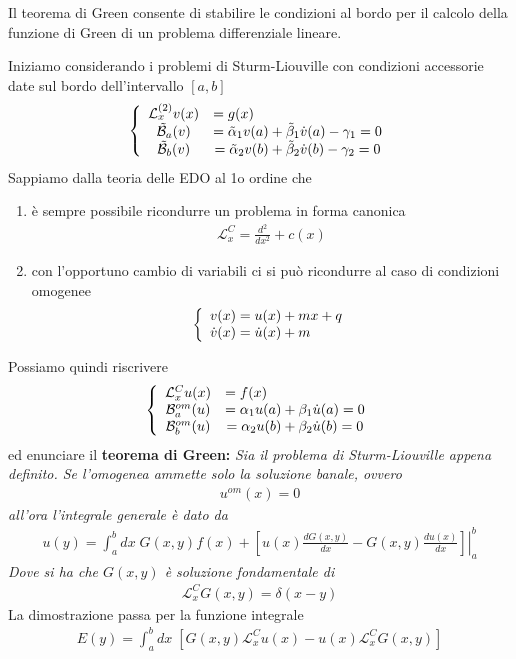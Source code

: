 Il teorema di Green consente di stabilire le condizioni al bordo per il calcolo della funzione di Green di un problema differenziale lineare.

Iniziamo considerando i problemi di Sturm-Liouville con condizioni accessorie date sul bordo dell'intervallo $[a,b]$
\begin{align}
	\triple{\mathcal{L}_x^{(2)} v(x) &= g(x) \hfill}{\mathcal{\tilde{B}}_a(v) &= \tilde{\alpha}_1 v(a) + \tilde{\beta}_1 \dot{v}(a) - \gamma_1 = 0}{\mathcal{\tilde{B}}_b(v) &= \tilde{\alpha}_2 v(b) + \tilde{\beta}_2 \dot{v}(b) - \gamma_2 = 0}
\end{align}
Sappiamo dalla teoria delle EDO al 1o ordine che 
\begin{enumerate}
	\item è sempre possibile ricondurre un problema in forma canonica
	\begin{align}
		\mathcal{L}_x^{C} = \frac{d^2}{dx^2} + c(x) \label{omcond3}
	\end{align} 
	\item con l'opportuno cambio di variabili ci si può ricondurre al caso di condizioni omogenee
	\begin{align}
		\double{v(x) = u(x)+ mx + q}{\dot{v}(x) = \dot{u}(x) +m \hfill}			
	\end{align}
\end{enumerate}
Possiamo quindi riscrivere
\begin{align}
	\triple{\mathcal{L}_x^{C} u(x) &= f(x) \hfill}{\mathcal{B}^{om}_a(u) &= \alpha_1 u(a) + \beta_1 \dot{u}(a) = 0}{\mathcal{B}^{om}_b(u) &= \alpha_2 u(b) + \beta_2 \dot{u}(b) = 0} \label{omcond1}
\end{align}
ed enunciare il \textbf{teorema di Green:} \textit{Sia il problema di Sturm-Liouville appena definito. Se l'omogenea ammette solo la soluzione banale, ovvero
	\begin{align}
		u^{om}(x) = 0
	\end{align}
	all'ora l'integrale generale è dato da
	\begin{align}
		u(y) = \int_{a}^{b} dx \; G(x,y) f(x) + \left.\left[ u(x) \frac{dG(x,y)}{dx} - G(x,y) \frac{du(x)}{dx} \right]\right|_a^b
	\end{align}
	Dove si ha che $G(x,y)$ è soluzione fondamentale di
	\begin{align}
		\mathcal{L}_x^{C} G(x,y) = \delta(x-y) \label{omcond2}
	\end{align}
}
La dimostrazione passa per la funzione integrale
\begin{align}
	E(y) = \int_{a}^{b} dx \; [G(x,y) \mathcal{L}_x^{C} u(x) - u(x)  \mathcal{L}_x^{C} G(x,y)]
\end{align}
